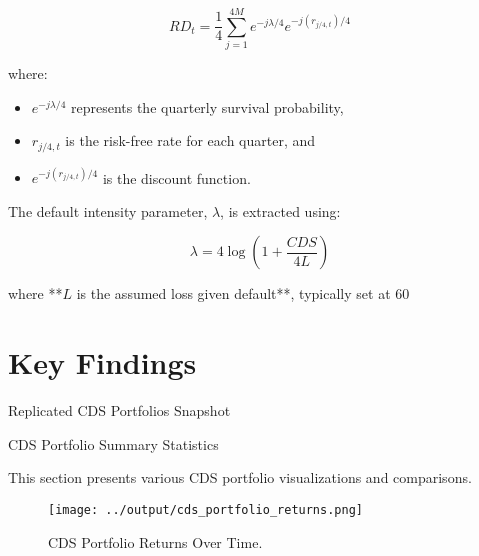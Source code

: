 \documentclass{article}
\begin{document}
\begin{equation}
    RD_t = \frac{1}{4} \sum_{j=1}^{4M} e^{-j\lambda/4} e^{-j(r_{j/4,t})/4}
\end{equation}

where:
\begin{itemize}
    \item $e^{-j\lambda/4}$ represents the quarterly survival probability,
    \item $r_{j/4,t}$ is the risk-free rate for each quarter, and
    \item $e^{-j(r_{j/4,t})/4}$ is the discount function.
\end{itemize}

The default intensity parameter, $\lambda$, is extracted using:

\begin{equation}
    \lambda = 4 \log \left(1 + \frac{CDS}{4L} \right)
\end{equation}

where **$L$ is the assumed loss given default**, typically set at 60%

\section{Key Findings}

\begin{table}[H]
    \centering
    \caption{Replicated CDS Portfolios Snapshot}
    \label{tab:cds_snapshot}
\end{table}

\begin{table}[H]
    \centering
    \caption{CDS Portfolio Summary Statistics}
    \label{tab:cds_summary}
\end{table}

This section presents various CDS portfolio visualizations and comparisons.

\begin{figure}[H]
    \centering
    \texttt{[image: ../output/cds\_portfolio\_returns.png]}  %
    \caption{\label{fig:cds_portfolio_returns}CDS Portfolio Returns Over Time.}
\end{figure}
\end{document}
